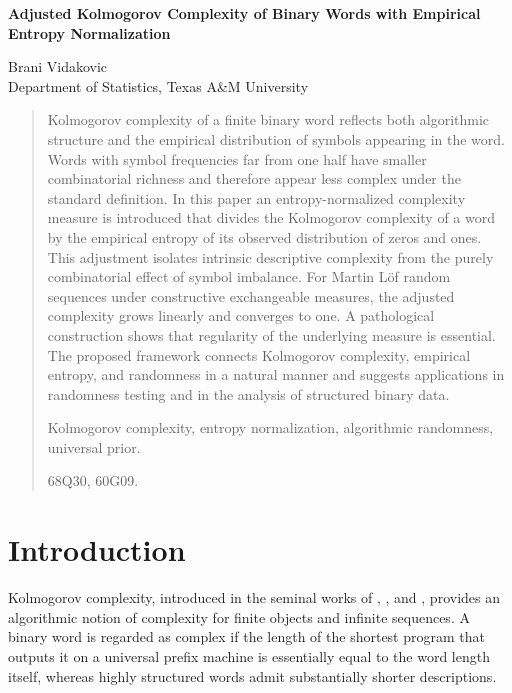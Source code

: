 \documentclass[12pt]{article}
\begin{document}
\setcounter{figure}{0}


\begin{center}
{\Large \bf Adjusted Kolmogorov Complexity of Binary Words with Empirical Entropy Normalization}
\end{center}

\begin{center}
    {\large Brani Vidakovic}\\
    Department of Statistics, Texas A\&M University
\end{center}

\vspace{0.5in}

\begin{quote}
{\footnotesize
Kolmogorov complexity of a finite binary word reflects both algorithmic structure
and the empirical distribution of symbols appearing in the word. Words with
symbol frequencies far from one half have smaller combinatorial richness and
therefore appear less complex under the standard definition. In this paper an
entropy-normalized complexity measure is introduced that divides the Kolmogorov
complexity of a word by the empirical entropy of its observed distribution of
zeros and ones. This adjustment isolates intrinsic descriptive complexity from
the purely combinatorial effect of symbol imbalance. For Martin L\"of random
sequences under constructive exchangeable measures, the adjusted complexity
grows linearly and converges to one. A pathological construction shows that
regularity of the underlying measure is essential. The proposed framework
connects Kolmogorov complexity, empirical entropy, and randomness in a natural
manner and suggests applications in randomness testing and in the analysis of
structured binary data.

 Kolmogorov complexity, entropy normalization,
algorithmic randomness, universal prior.

 68Q30, 60G09.
}
\end{quote}

\section{Introduction}
\label{sec:intro}

Kolmogorov complexity, introduced in the seminal works of
\citet{Kolmogorov1965}, \citet{ZvonkinLevin1970}, and \citet{Levin1974}, provides
an algorithmic notion of complexity for finite objects and infinite sequences.
A binary word is regarded as complex if the length of the shortest program that
outputs it on a universal prefix machine is essentially equal to the word
length itself, whereas highly structured words admit substantially shorter
descriptions.
\end{document}
